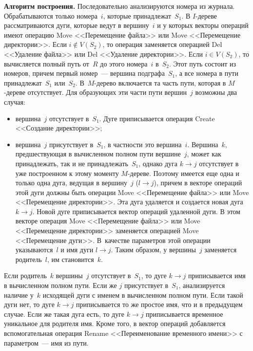 \begin{multicols}{2}
            \smallskip
            
            \noindent
      \textbf{Алгоритм построения.} Последовательно анализируются 
номера из журнала. Обрабатываются только номера~$i$, которые 
принадлежат~$S_1$. В $I$-дереве рассматриваются  дуги, которые ведут в 
вершину~$i$ и у которых векторы операций имеют операцию Move 
<<Перемещение файла>> или Move <<Перемещение директории>>. Если  
$i\notin V(S_2)$, то операция заменяется операцией Del <<Удаление файла>> 
или Del <<Удаление директории>>. Если  $i\in V(S_2)$, то вычисляется полный 
путь от~$R$ до этого номера~$i$ в~$S_2$. Этот путь состоит из номеров, 
причем первый номер~--- вершина подграфа~$S_1$, а все номера в пути 
принадлежат~$S_1$ или~$S_2$. В~$M$-дерево включается та часть пути, которая 
в $M$-дереве отсутствует. Для образующих эти части пути вершин~$j$ 
возможны два случая:
      \begin{itemize}
\item вершина~$j$ отсутствует в~$S_1$. Дуге приписывается операция Create 
<<Создание директории>>;
\item вершина~$j$ присутствует в~$S_1$, в частности это вершина~$i$. 
Вершина~$k$, предшествующая в вычисленном полном пути вершине~$j$, 
может как принадлежать, так и не принадлежать~$S_1$, однако дуга 
$k\rightarrow j$ отсутствует в уже построенном к этому моменту 
$M$-дереве. Поэтому имеется еще одна и только одна дуга, ведущая в 
вершину~$j$ ($l\rightarrow j$), причем в векторе операций этой дуги должны 
быть операции Move <<Перемещение файла>> или Move <<Перемещение 
директории>>.  Эта дуга удаляется и создается новая дуга $k\rightarrow j$. 
Новой дуге приписывается вектор операций удаленной дуги. В этом векторе 
операция Move <<Перемещение файла>> или Move <<Перемещение 
директории>> заменяется операцией Move <<Перемещение дуги>>. 
В~качестве параметров этой операции указываются~$l$ и имя дуги 
$l\rightarrow j$. Таким образом, у вершины~$j$ заменяется родитель~$l$, им 
становится~$k$. 
\end{itemize}

      Если родитель~$k$ вершины~$j$ отсутствует в~$S_1$, то дуге 
$k\rightarrow j$ приписывается имя в вычисленном полном пути. Если же $j$ 
присутствует в~$S_1$, анализируется наличие у~$k$ исходящей дуги с именем в 
вычисленном полном пути. Если такой дуги нет, то дуге $k\rightarrow j$ 
приписывается то же простое имя, что и в предыдущем случае. Если же такая 
дуга есть, то дуге $k\rightarrow j$ приписывается временное уникальное для 
родителя имя. Кроме того, в вектор операций добавляется вспомогательная 
операция Rename <<Переименование временного имени>> с параметром~---  
имя из пути. 
      

\end{multicols}
